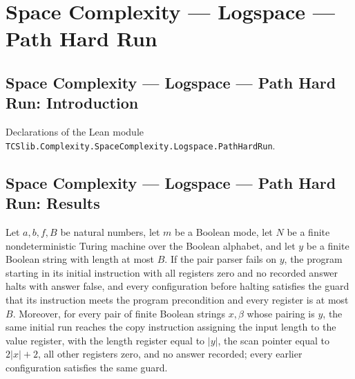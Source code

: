 \section{Space Complexity --- Logspace --- Path Hard Run}
\subsection*{Space Complexity --- Logspace --- Path Hard Run: Introduction}

Declarations of the Lean module \texttt{TCSlib.Complexity.SpaceComplexity.Logspace.PathHardRun}.

\subsection*{Space Complexity --- Logspace --- Path Hard Run: Results}

\begin{theorem}
\label{Complexity.PathHard.parse_run}
\leanok
{}
Let $a,b,f,B$ be natural numbers, let $m$ be a Boolean mode, let $N$ be a finite
nondeterministic Turing machine over the Boolean alphabet, and let $y$ be a finite
Boolean string with length at most $B$. If the pair parser fails on $y$, the program
starting in its initial instruction with all registers zero and no recorded answer halts
with answer false, and every configuration before halting satisfies the guard that its
instruction meets the program precondition and every register is at most $B$. Moreover,
for every pair of finite Boolean strings $x,\beta$ whose pairing is $y$, the same
initial run reaches the copy instruction assigning the input length to the value
register, with the length register equal to $|y|$, the scan pointer equal to $2|x|+2$,
all other registers zero, and no answer recorded; every earlier configuration satisfies
the same guard.
\end{theorem}

